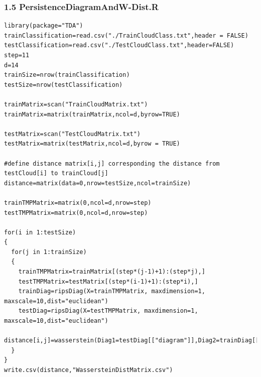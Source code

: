 \documentclass[12pt]{ctexart}
\begin{document}
\subsubsection*{1.5 PersistenceDiagramAndW-Dist.R}
\begin{scriptsize}
\begin{verbatim}
library(package="TDA")
trainClassification=read.csv("./TrainCloudClass.txt",header = FALSE)
testClassification=read.csv("./TestCloudClass.txt",header=FALSE)
step=11
d=14
trainSize=nrow(trainClassification)
testSize=nrow(testClassification)

trainMatrix=scan("TrainCloudMatrix.txt")
trainMatrix=matrix(trainMatrix,ncol=d,byrow=TRUE)

testMatrix=scan("TestCloudMatrix.txt")
testMatrix=matrix(testMatrix,ncol=d,byrow = TRUE)

#define distance matrix[i,j] corresponding the distance from testCloud[i] to trainCloud[j] 
distance=matrix(data=0,nrow=testSize,ncol=trainSize)

trainTMPMatrix=matrix(0,ncol=d,nrow=step)
testTMPMatrix=matrix(0,ncol=d,nrow=step)

for(i in 1:testSize)
{
  for(j in 1:trainSize)
  {
    trainTMPMatrix=trainMatrix[(step*(j-1)+1):(step*j),]
    testTMPMatrix=testMatrix[(step*(i-1)+1):(step*i),]
    trainDiag=ripsDiag(X=trainTMPMatrix, maxdimension=1, maxscale=10,dist="euclidean")
    testDiag=ripsDiag(X=testTMPMatrix, maxdimension=1, maxscale=10,dist="euclidean")
    distance[i,j]=wasserstein(Diag1=testDiag[["diagram"]],Diag2=trainDiag[["diagram"]],dimension=0)
  }
}
write.csv(distance,"WassersteinDistMatrix.csv")
\end{verbatim}
\end{scriptsize}
\end{document}
